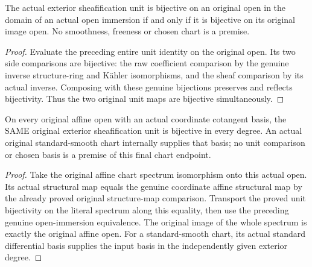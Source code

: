 \begin{theorem}\label{sc0-open-immersion-sheaf-units:bijective}
\leanok
{}
The actual exterior sheafification unit is bijective on an original open in the domain of an actual open immersion if and only if it is bijective on its original image open. No smoothness, freeness or chosen chart is a premise.
\end{theorem}
\begin{proof}
Evaluate the preceding entire unit identity on the original open. Its two side comparisons are bijective: the raw coefficient comparison by the genuine inverse structure-ring and Kähler isomorphisms, and the sheaf comparison by its actual inverse. Composing with these genuine bijections preserves and reflects bijectivity. Thus the two original unit maps are bijective simultaneously.
\end{proof}

\begin{theorem}\label{sc0-open-immersion-sheaf-units:original-chart}
\leanok
{}
On every original affine open with an actual coordinate cotangent basis, the SAME original exterior sheafification unit is bijective in every degree. An actual original standard-smooth chart internally supplies that basis; no unit comparison or chosen basis is a premise of this final chart endpoint.
\end{theorem}
\begin{proof}
Take the original affine chart spectrum isomorphism onto this actual open. Its actual structural map equals the genuine coordinate affine structural map by the already proved original structure-map comparison. Transport the proved unit bijectivity on the literal spectrum along this equality, then use the preceding genuine open-immersion equivalence. The original image of the whole spectrum is exactly the original affine open. For a standard-smooth chart, its actual standard differential basis supplies the input basis in the independently given exterior degree.
\end{proof}
